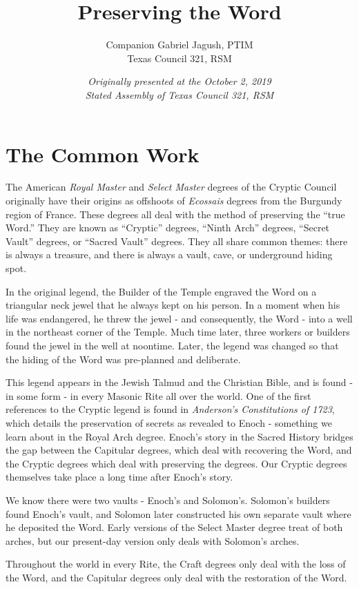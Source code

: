 \documentclass[letterpaper,11pt]{article}
\title{Preserving the Word}
\author{Companion Gabriel Jagush, PTIM\\Texas Council \textnumero{} 321, RSM}
\date{\textit{Originally presented at the October 2, 2019\\Stated Assembly of Texas Council \textnumero{} 321, RSM}}
\begin{document}
	
	\maketitle
	
	\section*{The Common Work}
	
	The American \textit{Royal Master} and \textit{Select Master} degrees of the Cryptic Council originally have their origins as offshoots of \textit{Ecossais} degrees from the Burgundy region of France. These degrees all deal with the method of preserving the “true Word.” They are known as “Cryptic” degrees, “Ninth Arch” degrees, “Secret Vault” degrees, or “Sacred Vault” degrees. They all share common themes: there is always a treasure, and there is always a vault, cave, or underground hiding spot.
	
	In the original legend, the Builder of the Temple engraved the Word on a triangular neck jewel that he always kept on his person. In a moment when his life was endangered, he threw the jewel - and consequently, the Word - into a well in the northeast corner of the Temple. Much time later, three workers or builders found the jewel in the well at noontime. Later, the legend was changed so that the hiding of the Word was pre-planned and deliberate.
	
	This legend appears in the Jewish Talmud and the Christian Bible, and is found - in some form - in every Masonic Rite all over the world. One of the first references to the Cryptic legend is found in \textit{Anderson's Constitutions of 1723}, which details the preservation of secrets as revealed to Enoch - something we learn about in the Royal Arch degree. Enoch's story in the Sacred History bridges the gap between the Capitular degrees, which deal with recovering the Word, and the Cryptic degrees which deal with preserving the degrees. Our Cryptic degrees themselves take place a long time after Enoch's story.
	
	We know there were two vaults - Enoch's and Solomon's. Solomon's builders found Enoch's vault, and Solomon later constructed his own separate vault where he deposited the Word. Early versions of the Select Master degree treat of both arches, but our present-day version only deals with Solomon's arches.
	
	Throughout the world in every Rite, the Craft degrees only deal with the loss of the Word, and the Capitular degrees only deal with the restoration of the Word.
	
\end{document}
